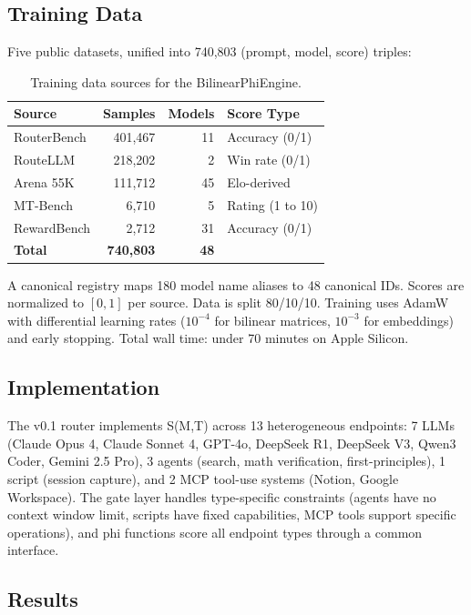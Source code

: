 \subsection{Training Data}

Five public datasets, unified into 740,803 (prompt, model, score) triples:

\begin{table}[h]
\centering
\caption{Training data sources for the BilinearPhiEngine.}
\label{tab:training_data}
\small
\begin{tabular}{lrrl}
\toprule
\textbf{Source} & \textbf{Samples} & \textbf{Models} & \textbf{Score Type} \\
\midrule
RouterBench & 401,467 & 11 & Accuracy (0/1) \\
RouteLLM & 218,202 & 2 & Win rate (0/1) \\
Arena 55K & 111,712 & 45 & Elo-derived \\
MT-Bench & 6,710 & 5 & Rating (1 to 10) \\
RewardBench & 2,712 & 31 & Accuracy (0/1) \\
\midrule
\textbf{Total} & \textbf{740,803} & \textbf{48} & \\
\bottomrule
\end{tabular}
\end{table}

A canonical registry maps 180 model name aliases to 48 canonical IDs. Scores are normalized to $[0,1]$ per source. Data is split 80/10/10. Training uses AdamW with differential learning rates ($10^{-4}$ for bilinear matrices, $10^{-3}$ for embeddings) and early stopping. Total wall time: under 70 minutes on Apple Silicon.

\subsection{Implementation}

The v0.1 router implements S(M,T) across 13 heterogeneous endpoints: 7 LLMs (Claude Opus 4, Claude Sonnet 4, GPT-4o, DeepSeek R1, DeepSeek V3, Qwen3 Coder, Gemini 2.5 Pro), 3 agents (search, math verification, first-principles), 1 script (session capture), and 2 MCP tool-use systems (Notion, Google Workspace). The gate layer handles type-specific constraints (agents have no context window limit, scripts have fixed capabilities, MCP tools support specific operations), and phi functions score all endpoint types through a common interface.

\subsection{Results}

